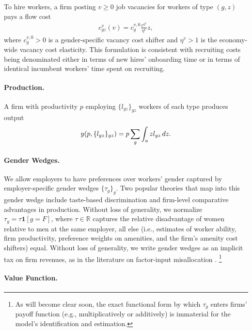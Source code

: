 To hire workers, a firm posting $v \ge 0$ job vacancies for workers of type $(g, z)$ pays a flow cost
%
\begin{align}
    c_{gz}^{v}(v) = c_{g}^{v,0} \frac{v^{\eta^{v}}}{\eta^{v}} z, \label{eq:vacancy_cost_fn}
\end{align}
%
where $c_{g}^{v,0} > 0$ is a gender-specific vacancy cost shifter and $\eta^{v} > 1$ is the economy-wide vacancy cost elasticity. This formulation is consistent with recruiting costs being denominated either in terms of new hires' onboarding time or in terms of identical incumbent workers' time spent on recruiting.


\paragraph{Production.}

A firm with productivity $p$ employing $\{ l_{gz} \}_{gz}$ workers of each type produces output
%
\begin{align}
    y(p, \{ l_{gz} \}_{gz}) = p \sum_{g} \int_{a} z l_{gz} \mathop{}\!{d} z .
\end{align}
%


\paragraph{Gender Wedges.}

We allow employers to have preferences over workers' gender captured by employer-specific gender wedges $\{\tau_{g}\}_{g}$. Two popular theories that map into this gender wedge include taste-based discrimination and firm-level comparative advantages in production. Without loss of generality, we normalize $\tau_{g} = \tau \mathbf{1}[g = F]$, where $\tau \in \mathbb{R}$ captures the relative disadvantage of women relative to men at the same employer, all else (i.e., estimates of worker ability, firm productivity, preference weights on amenities, and the firm's amenity cost shifters) equal. Without loss of generality, we write gender wedges as an implicit tax on firm revenues, as in the literature on factor-input misallocation \cite[e.g.,][]{RestucciaRogerson2008}.%
%
\footnote{As will become clear soon, the exact functional form by which $\tau_{g}$ enters firms' payoff function (e.g., multiplicatively or additively) is immaterial for the model's identification and estimation.} %
%


\paragraph{Value Function.}

